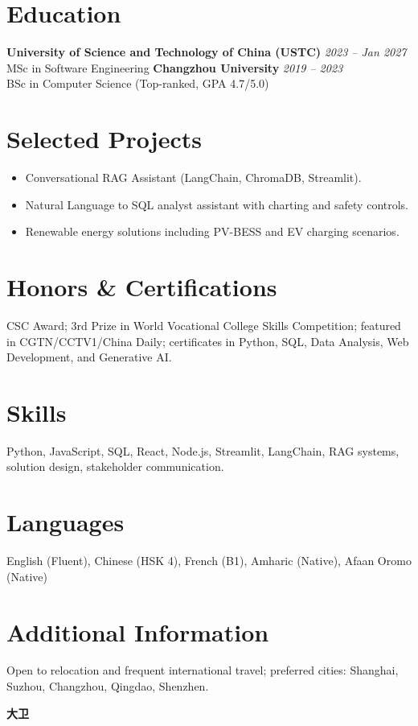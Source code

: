 \documentclass[9pt,a4paper]{article}
\newcommand{\cvname}[1]{{\LARGE\bfseries #1}}
\newcommand{\entry}[3]{\textbf{#1} \hfill \textit{#2}\\#3\vspace{0.1em}}
\begin{document}
\section*{Education}
\entry{University of Science and Technology of China (USTC)}{2023 -- Jan 2027}{MSc in Software Engineering}
\entry{Changzhou University}{2019 -- 2023}{BSc in Computer Science (Top-ranked, GPA 4.7/5.0)}

\section*{Selected Projects}
\begin{itemize}
  \item Conversational RAG Assistant (LangChain, ChromaDB, Streamlit).
  \item Natural Language to SQL analyst assistant with charting and safety controls.
  \item Renewable energy solutions including PV-BESS and EV charging scenarios.
\end{itemize}

\section*{Honors \& Certifications}
CSC Award; 3rd Prize in World Vocational College Skills Competition; featured in CGTN/CCTV1/China Daily; certificates in Python, SQL, Data Analysis, Web Development, and Generative AI.

\section*{Skills}
Python, JavaScript, SQL, React, Node.js, Streamlit, LangChain, RAG systems, solution design, stakeholder communication.

\section*{Languages}
English (Fluent), Chinese (HSK 4), French (B1), Amharic (Native), Afaan Oromo (Native)

\section*{Additional Information}
Open to relocation and frequent international travel; preferred cities: Shanghai, Suzhou, Changzhou, Qingdao, Shenzhen.

\newpage

\cvname{大卫}
\end{document}
